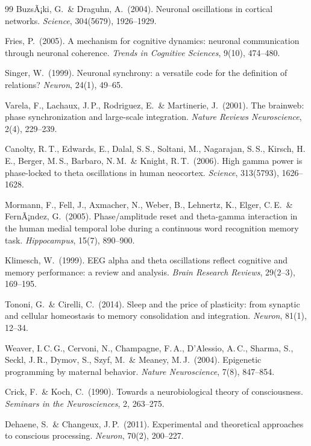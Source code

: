 ﻿\documentclass[a4paper,12pt]{article}
\theoremstyle{definition}
\begin{document}
\begin{thebibliography}{99}
	BuzsÃ¡ki, G.\ \& Draguhn, A.\ (2004).
	Neuronal oscillations in cortical networks.
	\textit{Science}, 304(5679), 1926--1929.

	Fries, P.\ (2005).
	A mechanism for cognitive dynamics: neuronal communication through neuronal coherence.
	\textit{Trends in Cognitive Sciences}, 9(10), 474--480.

	Singer, W.\ (1999).
	Neuronal synchrony: a versatile code for the definition of relations?
	\textit{Neuron}, 24(1), 49--65.

	Varela, F., Lachaux, J.\,P., Rodriguez, E.\ \& Martinerie, J.\ (2001).
	The brainweb: phase synchronization and large-scale integration.
	\textit{Nature Reviews Neuroscience}, 2(4), 229--239.

	Canolty, R.\,T., Edwards, E., Dalal, S.\,S., Soltani, M., Nagarajan, S.\,S., Kirsch, H.\,E., Berger, M.\,S., Barbaro, N.\,M.\ \& Knight, R.\,T.\ (2006).
	High gamma power is phase-locked to theta oscillations in human neocortex.
	\textit{Science}, 313(5793), 1626--1628.

	Mormann, F., Fell, J., Axmacher, N., Weber, B., Lehnertz, K., Elger, C.\,E.\ \& FernÃ¡ndez, G.\ (2005).
	Phase/amplitude reset and theta-gamma interaction in the human medial temporal lobe during a continuous word recognition memory task.
	\textit{Hippocampus}, 15(7), 890--900.

	Klimesch, W.\ (1999).
	EEG alpha and theta oscillations reflect cognitive and memory performance: a review and analysis.
	\textit{Brain Research Reviews}, 29(2--3), 169--195.

	Tononi, G.\ \& Cirelli, C.\ (2014).
	Sleep and the price of plasticity: from synaptic and cellular homeostasis to memory consolidation and integration.
	\textit{Neuron}, 81(1), 12--34.

	Weaver, I.\,C.\,G., Cervoni, N., Champagne, F.\,A., D'Alessio, A.\,C., Sharma, S., Seckl, J.\,R., Dymov, S., Szyf, M.\ \& Meaney, M.\,J.\ (2004).
	Epigenetic programming by maternal behavior.
	\textit{Nature Neuroscience}, 7(8), 847--854.

	Crick, F.\ \& Koch, C.\ (1990).
	Towards a neurobiological theory of consciousness.
	\textit{Seminars in the Neurosciences}, 2, 263--275.

	Dehaene, S.\ \& Changeux, J.\,P.\ (2011).
	Experimental and theoretical approaches to conscious processing.
	\textit{Neuron}, 70(2), 200--227.


\end{thebibliography}
\end{document}
